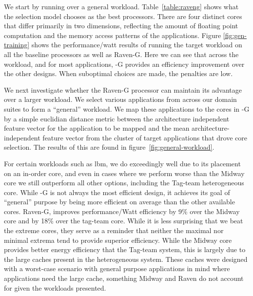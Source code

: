
We start by running \blackBox{} over a general
workload. Table~\ref{table:raveng} shows what the selection model
chooses as the best processors. There are four distinct cores that
differ primarily in two dimensions, reflecting the amount of floating
point computation and the memory access patterns of the applications.
Figure \ref{fig:gen-training} shows the performance/watt results of
running the target workload on all the baseline processors as well as
Raven-G.  Here we can see that across the workload, and for most
applications, \Ravan{}-G provides an efficiency improvement over the
other designs. When suboptimal choices are made, the penalties are
low.

We next investigate whether the Raven-G processor can maintain its
advantage over a larger workload. We select various applications from
across our domain suites to form a ``general'' workload. We map these
applications to the cores in \Ravan{}-G by a simple euclidian distance
metric between the architecture independent feature vector for the
application to be mapped and the mean architecture-independent feature
vector from the cluster of target applications that drove core
selection. The results of this are found in
figure~\ref{fig:general-workload}.

For certain workloads such as lbm, we do exceedingly well due to its
placement on an in-order core, and even in cases where we perform
worse than the Midway core we still outperform all other options,
including the Tag-team heterogeneous core. While \Ravan{}-G is not
always the most efficient design, it achieves its goal of ``general''
purpose by being more efficient on average than the other available
cores. Raven-G, improves performance/Watt efficiency by 9\% over the
Midway core and by 18\% over the tag-team core. While it is less
surprising that we beat the extreme cores, they serve as a reminder
that neither the maximal nor minimal extrema tend to provide superior
efficiency. While the Midway core provides better energy efficiency 
that the Tag-team system, this is largely due to the large caches
present in the heterogeneous system. These caches were designed with
a worst-case scenario with general purpose applications in mind 
where applications need the large cache, something Midway and Raven 
do not account for given the workloads presented.

